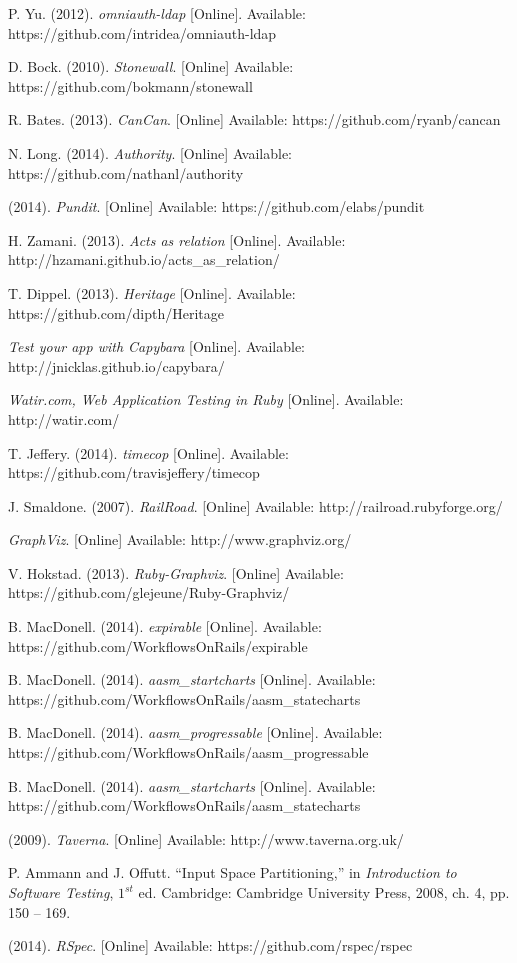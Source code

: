 \begin{thebibliography}{99}
P. Yu. (2012). \textit{omniauth-ldap} [Online]. Available: https://github.com/intridea/omniauth-ldap

D. Bock. (2010). \textit{Stonewall}. [Online] Available: https://github.com/bokmann/stonewall

R. Bates. (2013). \textit{CanCan}. [Online] Available: https://github.com/ryanb/cancan

N. Long. (2014). \textit{Authority}. [Online] Available: https://github.com/nathanl/authority

(2014). \textit{Pundit}. [Online] Available: https://github.com/elabs/pundit

H. Zamani. (2013). \textit{Acts as relation} [Online]. Available: http://hzamani.github.io/acts\_as\_relation/

T. Dippel. (2013). \textit{Heritage} [Online]. Available: https://github.com/dipth/Heritage

\textit{Test your app with Capybara} [Online]. Available: http://jnicklas.github.io/capybara/

\textit{Watir.com, Web Application Testing in Ruby} [Online]. Available: http://watir.com/

T. Jeffery. (2014). \textit{timecop} [Online]. Available: https://github.com/travisjeffery/timecop

J. Smaldone. (2007). \textit{RailRoad}. [Online] Available: http://railroad.rubyforge.org/

\textit{GraphViz}. [Online] Available: http://www.graphviz.org/

V. Hokstad. (2013). \textit{Ruby-Graphviz}. [Online] Available: https://github.com/glejeune/Ruby-Graphviz/

B. MacDonell. (2014). \textit{expirable} [Online]. Available: https://github.com/WorkflowsOnRails/expirable

B. MacDonell. (2014). \textit{aasm\_startcharts} [Online]. Available: https://github.com/WorkflowsOnRails/aasm\_statecharts

B. MacDonell. (2014). \textit{aasm\_progressable} [Online]. Available: https://github.com/WorkflowsOnRails/aasm\_progressable

B. MacDonell. (2014). \textit{aasm\_startcharts} [Online]. Available: https://github.com/WorkflowsOnRails/aasm\_statecharts

(2009). \textit{Taverna}. [Online] Available: http://www.taverna.org.uk/

P. Ammann and J. Offutt. ``Input Space Partitioning,'' in \textit{Introduction to Software Testing}, $1^{st}$ ed. Cambridge: Cambridge University Press, 2008, ch. 4, pp. 150 -- 169.

(2014). \textit{RSpec}. [Online] Available: https://github.com/rspec/rspec


\end{thebibliography}


